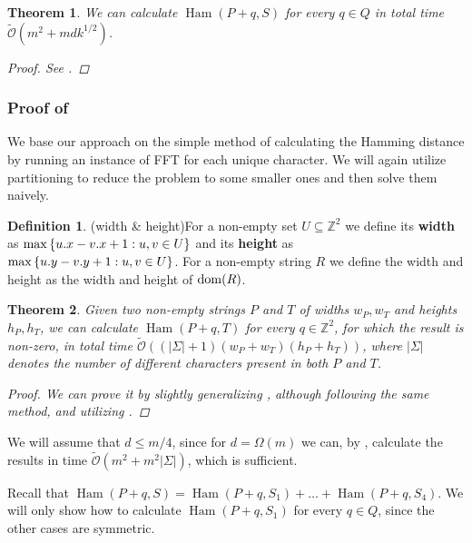\documentclass[11pt]{article}
\newcommand{\Z}{\mathbb{Z}}
\newcommand{\tO}{\tilde{\mathcal{O}}}
\newcommand{\set}[1]{\left\lbrace #1 \right\rbrace}
\theoremstyle{plain}
\newtheorem{theorem}{Theorem}
\theoremstyle{definition}
\newtheorem{definition}{Definition}
\theoremstyle{remark}
\DeclareMathOperator*{\Ham}{Ham}
\begin{document}
\begin{theorem}\label{dense_algo}
	We can calculate $\Ham(P + q, S)$ for every $q \in Q$ in total time $\tO(m^2 + mdk^{1/2})$.
	\begin{proof} See . \end{proof}
\end{theorem}


\subsubsection{Proof of } \label{sigma_border_proof}

We base our approach on the simple method of calculating the Hamming distance by running an instance of FFT for each unique character.
We will again utilize partitioning to reduce the problem to some smaller ones and then solve them naively.

\begin{definition}(width \& height)\label{width_and_height_definition}
	For a non-empty set $U \subseteq \Z^2$ we define its \textbf{width} as $\max\set{\x{u} - \x{v} + 1 : u, v \in U}$
	and its \textbf{height} as $\max\set{\y{u} - \y{v} + 1 : u, v \in U}$.
	For a non-empty string $R$ we define the width and height as the width and height of $\operatorname*{dom}(R)$.
\end{definition}

\begin{theorem}\label{general_fft}
	Given two non-empty strings $P$ and $T$ of widths $w_P, w_T$ and heights $h_P, h_T$, we can calculate $\Ham(P + q, T)$ for every $q \in \Z^2$, for which the result is non-zero, in total time $\tO((|\Sigma| + 1)(w_P + w_T)(h_P + h_T))$, where $|\Sigma|$ denotes the number of different characters present in both $P$ and $T$.
	\begin{proof}
		We can prove it by slightly generalizing , although following the same method, and utilizing .
	\end{proof}
\end{theorem}

We will assume that $d \le m / 4$, since for $d = \Omega(m)$ we can, by , calculate the results in time $\tO(m^2 + m^2|\Sigma|)$, which is sufficient.

Recall that 
$\Ham(P + q, S) = \Ham(P + q, S_1) + \dots + \Ham(P + q, S_4)$.
We will only show how to calculate $\Ham(P + q, S_1)$ for every $q \in Q$, since the other cases are symmetric.
\end{document}
